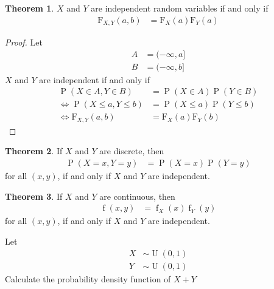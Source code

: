 \documentclass[titlepage, fleqn, a4paper, 12pt, twoside]{article}
\theoremstyle{definition}
\theoremstyle{theorem}
\newtheorem{theorem}{Theorem}
\DeclareMathOperator{\prob}{\mathrm{P}}
\DeclareMathOperator{\pdf}{\mathrm{f}}
\DeclareMathOperator{\uniform}{\mathrm{U}}
\newcommand*{\cdf}[1]{\mathrm{F}_{#1}}
\begin{document}
\begin{theorem}
	$X$ and $Y$ are independent random variables if and only if
	\begin{align*}
		\cdf{X,Y}(a,b) & = \cdf{X}(a) \cdf{Y}(a)
	\end{align*}
\end{theorem}

\begin{proof}
	Let
	\begin{align*}
		A & = (-\infty,a] \\
		B & = (-\infty,b]
	\end{align*}
	$X$ and $Y$ are independent if and only if
	\begin{align*}
		\prob(X \in A , Y \in B)      & = \prob(X \in A) \prob(Y \in B) \\
		\iff \prob(X \le a , Y \le b) & = \prob(X \le a) \prob(Y \le b) \\
		\iff \cdf{X,Y}(a,b)           & = \cdf{X}(a) \cdf{Y}(b)
	\end{align*}
\end{proof}

\begin{theorem}
	If $X$ and $Y$ are discrete, then
	\begin{align*}
		\prob(X = x , Y = y) & = \prob(X = x) \prob(Y = y)
	\end{align*}
	for all $(x,y)$, if and only if $X$ and $Y$ are independent.
\end{theorem}

\begin{theorem}
	If $X$ and $Y$ are continuous, then
	\begin{align*}
		\pdf(x,y) & = \pdf_X(x) \pdf_Y(y)
	\end{align*}
	for all $(x,y)$, if and only if $X$ and $Y$ are independent.
\end{theorem}

\begin{question}
	Let
	\begin{align*}
		X & \sim \uniform(0,1) \\
		Y & \sim \uniform(0,1)
	\end{align*}
	Calculate the probability density function of $X + Y$
\end{question}
\end{document}
